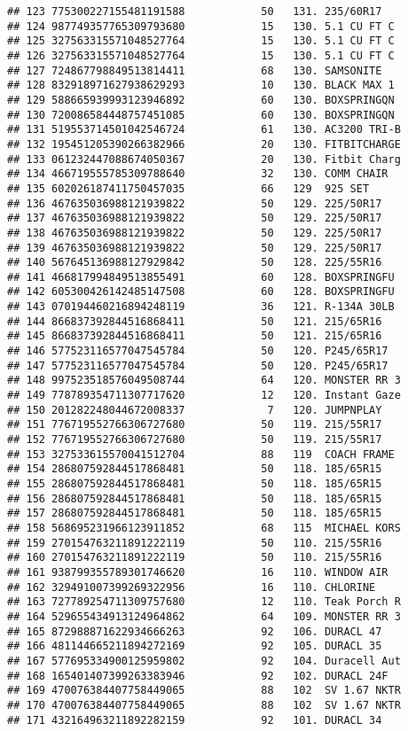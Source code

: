 \documentclass[]{article}
\begin{document}
\begin{verbatim}
## 123 775300227155481191588            50   131. 235/60R17   
## 124 987749357765309793680            15   130. 5.1 CU FT C 
## 125 327563315571048527764            15   130. 5.1 CU FT C 
## 126 327563315571048527764            15   130. 5.1 CU FT C 
## 127 724867798849513814411            68   130. SAMSONITE   
## 128 832918971627938629293            10   130. BLACK MAX 1 
## 129 588665939993123946892            60   130. BOXSPRINGQN 
## 130 720086584448757451085            60   130. BOXSPRINGQN 
## 131 519553714501042546724            61   130. AC3200 TRI-B
## 132 195451205390266382966            20   130. FITBITCHARGE
## 133 061232447088674050367            20   130. Fitbit Charg
## 134 466719555785309788640            32   130. COMM CHAIR  
## 135 602026187411750457035            66   129  925 SET     
## 136 467635036988121939822            50   129. 225/50R17   
## 137 467635036988121939822            50   129. 225/50R17   
## 138 467635036988121939822            50   129. 225/50R17   
## 139 467635036988121939822            50   129. 225/50R17   
## 140 567645136988127929842            50   128. 225/55R16   
## 141 466817994849513855491            60   128. BOXSPRINGFU 
## 142 605300426142485147508            60   128. BOXSPRINGFU 
## 143 070194460216894248119            36   121. R-134A 30LB 
## 144 866837392844516868411            50   121. 215/65R16   
## 145 866837392844516868411            50   121. 215/65R16   
## 146 577523116577047545784            50   120. P245/65R17  
## 147 577523116577047545784            50   120. P245/65R17  
## 148 997523518576049508744            64   120. MONSTER RR 3
## 149 778789354711307717620            12   120. Instant Gaze
## 150 201282248044672008337             7   120. JUMPNPLAY   
## 151 776719552766306727680            50   119. 215/55R17   
## 152 776719552766306727680            50   119. 215/55R17   
## 153 327533615570041512704            88   119  COACH FRAME 
## 154 286807592844517868481            50   118. 185/65R15   
## 155 286807592844517868481            50   118. 185/65R15   
## 156 286807592844517868481            50   118. 185/65R15   
## 157 286807592844517868481            50   118. 185/65R15   
## 158 568695231966123911852            68   115  MICHAEL KORS
## 159 270154763211891222119            50   110. 215/55R16   
## 160 270154763211891222119            50   110. 215/55R16   
## 161 938799355789301746620            16   110. WINDOW AIR  
## 162 329491007399269322956            16   110. CHLORINE    
## 163 727789254711309757680            12   110. Teak Porch R
## 164 529655434913124964862            64   109. MONSTER RR 3
## 165 872988871622934666263            92   106. DURACL 47   
## 166 481144665211894272169            92   105. DURACL 35   
## 167 577695334900125959802            92   104. Duracell Aut
## 168 165401407399263383946            92   102. DURACL 24F  
## 169 470076384407758449065            88   102  SV 1.67 NKTR
## 170 470076384407758449065            88   102  SV 1.67 NKTR
## 171 432164963211892282159            92   101. DURACL 34
\end{verbatim}
\end{document}
